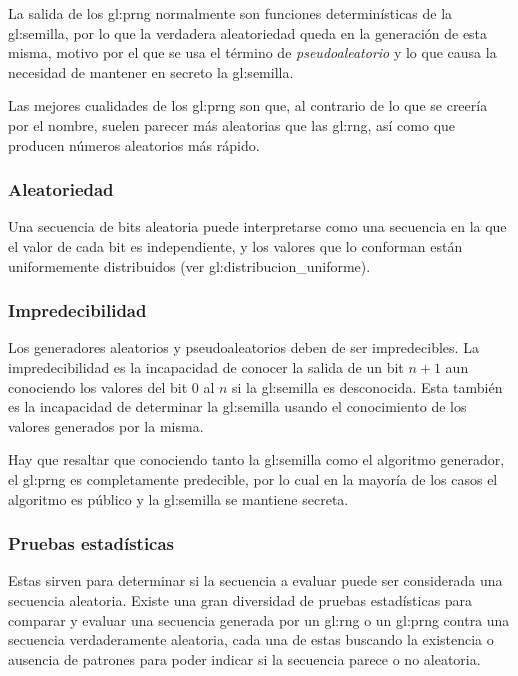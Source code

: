 La salida de los \gls{gl:prng} normalmente son funciones determinísticas de
la \gls{gl:semilla}, por lo que la verdadera aleatoriedad queda en la
generación de esta misma, motivo por el que se usa el término de
\textit{pseudoaleatorio} y lo que causa la necesidad de mantener en secreto
la \gls{gl:semilla}.

Las mejores cualidades de los \gls{gl:prng} son que, al contrario de lo que
se creería por el nombre, suelen parecer más aleatorias que las \gls{gl:rng},
así como que producen números aleatorios más rápido.

\subsubsection{Aleatoriedad} %

Una secuencia de bits aleatoria puede interpretarse como una secuencia en la
que el valor de cada bit es independiente, y los valores que lo conforman
están uniformemente distribuidos (ver \gls{gl:distribucion_uniforme}).

\subsubsection{Impredecibilidad} %
\label{sec:impredecibilidad}

Los generadores aleatorios y pseudoaleatorios deben de ser impredecibles.
La impredecibilidad es la incapacidad de conocer la salida de un bit $n+1$
aun conociendo los valores del bit $0$ al $n$ si la \gls{gl:semilla} es
desconocida. Esta también es la incapacidad de determinar la \gls{gl:semilla}
usando el conocimiento de los valores generados por la misma.

Hay que resaltar que conociendo tanto la \gls{gl:semilla} como el algoritmo
generador, el \gls{gl:prng} es completamente predecible, por lo cual en la
mayoría de los casos el algoritmo es público y la \gls{gl:semilla} se mantiene
secreta.

\subsubsection{Pruebas estadísticas} %

Estas sirven para determinar si la secuencia a evaluar puede ser considerada
una secuencia aleatoria. Existe una gran diversidad de pruebas estadísticas
para comparar y evaluar una secuencia generada por un \gls{gl:rng} o un
\gls{gl:prng} contra una secuencia verdaderamente aleatoria, cada una de
estas buscando la existencia o ausencia de patrones para poder indicar
si la secuencia parece o no aleatoria.

